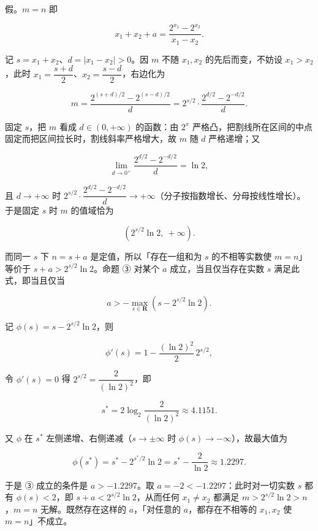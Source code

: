 \begin{answer}
假。\(m=n\) 即

\nopagebreak[4]
\[
x_1+x_2+a=\frac{2^{x_1}-2^{x_2}}{x_1-x_2}.
\]

记 \(s=x_1+x_2\)、\(d=|x_1-x_2|>0\)。因 \(m\) 不随 \(x_1,x_2\) 的先后而变，不妨设 \(x_1>x_2\)，此时 \(x_1=\dfrac{s+d}{2}\)、\(x_2=\dfrac{s-d}{2}\)，右边化为

\nopagebreak[4]
\[
m=\frac{2^{(s+d)/2}-2^{(s-d)/2}}{d}=2^{s/2}\cdot\frac{2^{d/2}-2^{-d/2}}{d}.
\]

固定 \(s\)，把 \(m\) 看成 \(d\in(0,+\infty)\) 的函数：由 \(2^{x}\) 严格凸，把割线所在区间的中点固定而把区间拉长时，割线斜率严格增大，故 \(m\) 随 \(d\) 严格递增；又

\nopagebreak[4]
\[
\lim_{d\to0^{+}}\frac{2^{d/2}-2^{-d/2}}{d}=\ln2,
\]

且 \(d\to+\infty\) 时 \(2^{s/2}\cdot\dfrac{2^{d/2}-2^{-d/2}}{d}\to+\infty\)（分子按指数增长、分母按线性增长）。于是固定 \(s\) 时 \(m\) 的值域恰为

\nopagebreak[4]
\[
\left(2^{s/2}\ln2,\ +\infty\right).
\]

而同一 \(s\) 下 \(n=s+a\) 是定值，所以「存在一组和为 \(s\) 的不相等实数使 \(m=n\)」等价于 \(s+a>2^{s/2}\ln2\)。命题 ③ 对某个 \(a\) 成立，当且仅当存在实数 \(s\) 满足此式，即当且仅当

\nopagebreak[4]
\[
a>-\max_{s\in\mathbf{R}}\left(s-2^{s/2}\ln2\right).
\]

记 \(\phi(s)=s-2^{s/2}\ln2\)，则

\nopagebreak[4]
\[
\phi'(s)=1-\frac{(\ln2)^{2}}{2}\,2^{s/2},
\]

令 \(\phi'(s)=0\) 得 \(2^{s/2}=\dfrac{2}{(\ln2)^{2}}\)，即

\nopagebreak[4]
\[
s^{*}=2\log_2\frac{2}{(\ln2)^{2}}\approx4.1151 .
\]

又 \(\phi\) 在 \(s^{*}\) 左侧递增、右侧递减（\(s\to\pm\infty\) 时 \(\phi(s)\to-\infty\)），故最大值为

\nopagebreak[4]
\[
\phi(s^{*})=s^{*}-2^{s^{*}/2}\ln2=s^{*}-\frac{2}{\ln2}\approx1.2297.
\]

于是 ③ 成立的条件是 \(a>-1.2297\)。取 \(a=-2<-1.2297\)：此时对一切实数 \(s\) 都有 \(\phi(s)<2\)，即 \(s+a<2^{s/2}\ln2\)，从而任何 \(x_1\neq x_2\) 都满足 \(m>2^{s/2}\ln2>n\)，\(m=n\) 无解。既然存在这样的 \(a\)，「对任意的 \(a\)，都存在不相等的 \(x_1,x_2\) 使 \(m=n\)」不成立。


\end{answer}
